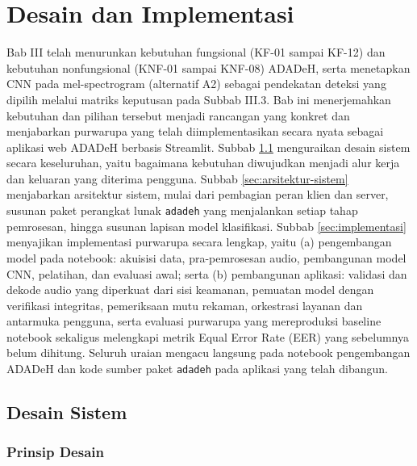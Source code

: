 \cleardoublepage
\chapter{Desain dan Implementasi}
\label{chap:desain-konsep-solusi}


Bab III telah menurunkan kebutuhan fungsional (KF-01 sampai KF-12) dan kebutuhan
nonfungsional (KNF-01 sampai KNF-08) ADADeH, serta menetapkan CNN pada
mel-spectrogram (alternatif A2) sebagai pendekatan deteksi yang dipilih melalui
matriks keputusan pada Subbab III.3. Bab ini menerjemahkan kebutuhan dan pilihan
tersebut menjadi rancangan yang konkret dan menjabarkan purwarupa yang telah
diimplementasikan secara nyata sebagai aplikasi web ADADeH berbasis Streamlit.
Subbab \ref{sec:desain-sistem} menguraikan desain sistem secara keseluruhan,
yaitu bagaimana kebutuhan diwujudkan menjadi alur kerja dan keluaran yang
diterima pengguna. Subbab \ref{sec:arsitektur-sistem} menjabarkan arsitektur
sistem, mulai dari pembagian peran klien dan server, susunan paket perangkat
lunak \texttt{adadeh} yang menjalankan setiap tahap pemrosesan, hingga susunan
lapisan model klasifikasi. Subbab \ref{sec:implementasi} menyajikan implementasi
purwarupa secara lengkap, yaitu (a) pengembangan model pada notebook: akuisisi
data, pra-pemrosesan audio, pembangunan model CNN, pelatihan, dan evaluasi awal;
serta (b) pembangunan aplikasi: validasi dan dekode audio yang diperkuat dari
sisi keamanan, pemuatan model dengan verifikasi integritas, pemeriksaan mutu
rekaman, orkestrasi layanan dan antarmuka pengguna, serta evaluasi purwarupa
yang mereproduksi baseline notebook sekaligus melengkapi metrik Equal Error Rate
(EER) yang sebelumnya belum dihitung. Seluruh uraian mengacu langsung pada
notebook pengembangan ADADeH dan kode sumber paket \texttt{adadeh} pada aplikasi
yang telah dibangun.

\section{Desain Sistem}
\label{sec:desain-sistem}

\subsection{Prinsip Desain}
\label{subsec:prinsip-desain}

